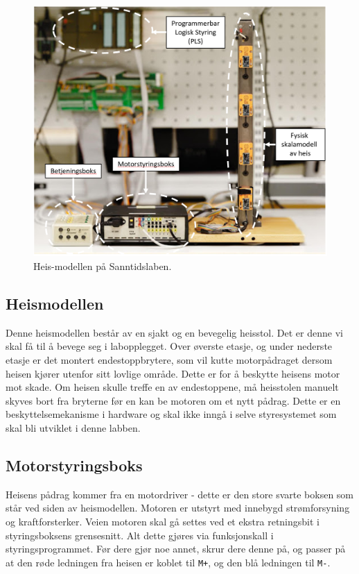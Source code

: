 \begin{alphasection}
\begin{figure}[ht!]
    \centering
    \includegraphics[scale=.85]{figures/heis.PNG}
    \caption{Heis-modellen på Sanntidslaben.}
    \label{fig:Heis-modell}
\end{figure}

\subsection{Heismodellen}

Denne heismodellen består av en sjakt og en bevegelig heisstol. Det er denne vi skal få til å bevege seg i labopplegget. Over øverste etasje, og under nederste etasje er det montert endestoppbrytere, som vil kutte motorpådraget dersom heisen kjører utenfor sitt lovlige område. Dette er for å beskytte heisens motor mot skade. Om heisen skulle treffe en av endestoppene, må heisstolen manuelt skyves bort fra bryterne før en kan be motoren om et nytt pådrag. Dette er en beskyttelsemekanisme i hardware og skal ikke inngå i selve styresystemet som skal bli utviklet i denne labben.



\subsection{Motorstyringsboks}
Heisens pådrag kommer fra en motordriver - dette er den store svarte boksen som står ved siden av heismodellen.  Motoren er utstyrt med innebygd strømforsyning og kraftforsterker. Veien motoren skal gå settes ved et ekstra retningsbit i styringsboksens grensesnitt. Alt dette gjøres via funksjonskall i styringsprogrammet. Før dere gjør noe annet, skrur dere denne på, og passer på at den røde ledningen fra heisen er koblet til \verb|M+|, og den blå ledningen til \verb|M-|.



\end{alphasection}
